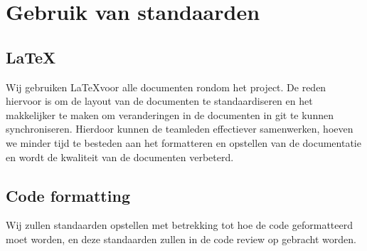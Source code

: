 \section{Gebruik van standaarden}
	\subsection{\LaTeX}
		Wij gebruiken \LaTeX voor alle documenten rondom het project.
		De reden hiervoor is om de layout van de documenten te standaardiseren en het makkelijker te maken om veranderingen in de documenten in git te kunnen synchroniseren.
		Hierdoor kunnen de teamleden effectiever samenwerken, hoeven we minder tijd te besteden aan het formatteren en opstellen van de documentatie en wordt de kwaliteit van de documenten verbeterd.
	\subsection{Code formatting}
		 Wij zullen standaarden opstellen met betrekking tot hoe de code geformatteerd moet worden, en deze standaarden zullen in de code review op gebracht worden.
